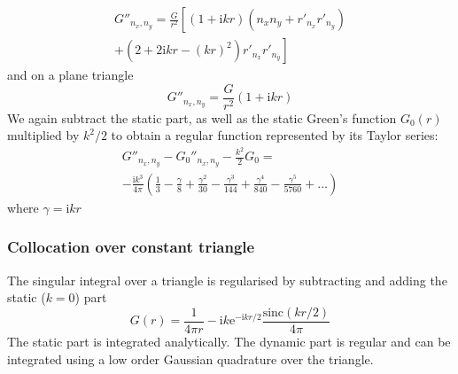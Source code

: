 \documentclass[a4paper,10pt,twocolumn]{article}
\newcommand{\te}{\mathrm{e}}
\newcommand{\ti}{\mathrm{i}}
\newcommand{\sinc}{\mathrm{sinc}}
\begin{document}
\begin{multline}
G''_{n_x, n_y} = \frac{G}{r^2} \left[ 
\left(1+\ti k r\right)\left(n_x n_y + r'_{n_x} r'_{n_y}\right) \right. \\
\left. + \left(2 + 2 \ti k r - (kr)^2\right) r'_{n_x} r'_{n_y}
\right]
\end{multline}
%
and on a plane triangle
%
\begin{equation}
G''_{n_x, n_y} = \frac{G}{r^2} \left(1+\ti k r\right)
\end{equation}
%
We again subtract the static part, as well as the static Green's function $G_0(r)$ multiplied by $k^2/2$ to obtain a regular function represented by its Taylor series:
%
\begin{multline}
G''_{n_x, n_y} - {G_0}''_{n_x, n_y} - \frac{k^2}{2} G_0 = \\
-\frac{\ti k^3}{4\pi}
\left(
\frac{1}{3}
- \frac\gamma{8} 
+ \frac{\gamma^2}{30} 
- \frac{\gamma^3}{144} 
+ \frac{\gamma^4}{840} 
-\frac{\gamma^5}{5760} 
+\dots
\right)
\end{multline}
%
where $\gamma = \ti k r$




\subsubsection{Collocation over constant triangle}

The singular integral over a triangle is regularised by subtracting and adding the static ($k = 0$) part
%
\begin{equation}
G(r) = \frac{1}{4\pi r} -\ti k \te^{-\ti k r/2} \frac{\sinc(k r/2)}{4\pi}
\end{equation}
%
The static part is integrated analytically.
The dynamic part is regular and can be integrated using a low order Gaussian quadrature over the triangle.
\end{document}
